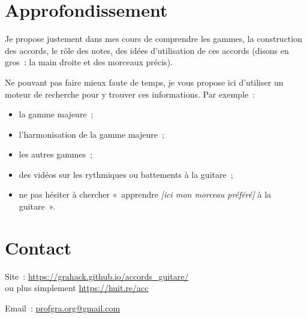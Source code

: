 \documentclass[11pt]{article}
\begin{document}
\section{Approfondissement} \label{approf}

Je propose justement dans mes cours de comprendre les gammes, la construction
des accords, le rôle des notes, des idées d’utilisation de ces accords (disons
en gros~: la main droite et des morceaux précis).

Ne pouvant pas faire mieux faute de temps, je vous propose ici d’utiliser un
moteur de recherche pour y trouver ces informations. Par exemple~:

\begin{itemize}
\item la gamme majeure~;
\item l’harmonisation de la gamme majeure~;
\item les autres gammes~;
\item des vidéos sur les rythmiques ou battements à la guitare~;
\item ne pas hésiter à chercher «~apprendre \textit{[ici mon morceau préféré]}
       à la guitare~».
\end{itemize}

\section{Contact} \label{contact}

\setlength{\parindent}{0pt}

Site~: \url{https://grahack.github.io/accords_guitare/} \\
ou plus simplement \url{https://huit.re/acc}

Email~: \url{profgra.org@gmail.com}
\end{document}

